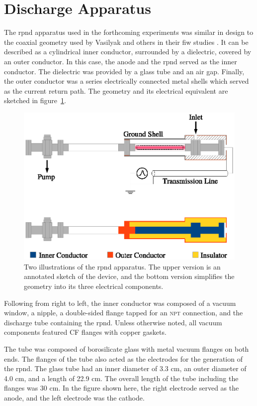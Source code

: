 \section{Discharge Apparatus}

The \acs{rpnd} apparatus used in the forthcoming experiments was similar in
design to the coaxial geometry used by Vasilyak and others in their \acs{fiw}
studies \cite{Vasilyak1994}. It can be described as a cylindrical inner
conductor, surrounded by a dielectric, covered by an outer conductor. In this
case, the anode and the \acs{rpnd} served as the inner conductor. The dielectric
was provided by a glass tube and an air gap. Finally, the outer conductor was a
series electrically connected metal shells which served as the current return
path. The geometry and its electrical equivalent are sketched in
figure~\ref{fig:appschem}.
\begin{figure}
  \centering
  \includegraphics{./chapters/experiment/figures/appschem.eps}
  \caption{Two illustrations of the \acs{rpnd} apparatus. The upper version is
    an annotated sketch of the device, and the bottom version simplifies the
    geometry into its three electrical components.}
  \label{fig:appschem}
\end{figure}
Following from right to left, the inner conductor was composed of a vacuum
window, a nipple, a double-sided flange tapped for an \textsc{npt} connection,
and the discharge tube containing the \acs{rpnd}. Unless otherwise noted, all
vacuum components featured  CF flanges with copper gaskets.

The tube was composed of borosilicate glass with metal vacuum flanges on both
ends. The flanges of the tube also acted as the electrodes for the generation of
the \acs{rpnd}. The glass tube had an inner diameter of 3.3 cm, an outer
diameter of 4.0 cm, and a length of 22.9 cm. The overall length of the tube
including the flanges was 30 cm. In the figure shown here, the right electrode
served as the anode, and the left electrode was the cathode.

